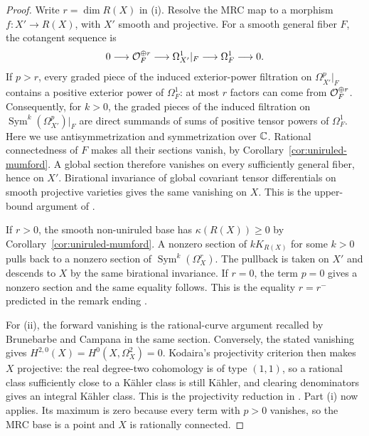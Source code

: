 \begin{proof}
Write \(r=\dim R(X)\) in \textup{(i)}. Resolve the MRC map to a morphism
\(f:X'\to R(X)\), with \(X'\) smooth and projective. For a smooth
general fiber \(F\), the cotangent sequence is
\[
 0\longrightarrow\mathcal{O}_F^{\oplus r}
 \longrightarrow\Omega_{X'}^1|_F
 \longrightarrow\Omega_F^1\longrightarrow0.
\]
If \(p>r\), every graded piece of the induced exterior-power filtration
on \(\Omega_{X'}^p|_F\) contains a positive exterior power of
\(\Omega_F^1\): at most \(r\) factors can come from
\(\mathcal{O}_F^{\oplus r}\). Consequently, for \(k>0\), the graded pieces
of the induced filtration on
\(\operatorname{Sym}^k(\Omega_{X'}^p)|_F\) are direct summands of
sums of positive tensor powers of \(\Omega_F^1\). Here we use
antisymmetrization and symmetrization over \(\mathbb{C}\). Rational
connectedness of \(F\) makes all their sections vanish, by
Corollary~\ref{cor:uniruled-mumford}. A global section therefore
vanishes on every sufficiently general fiber, hence on \(X'\).
Birational invariance of global covariant tensor differentials on smooth
projective varieties gives the same vanishing on \(X\). This is the
upper-bound argument of \cite[Section~3]{BrunebarbeCampana2015}.

If \(r>0\), the smooth non-uniruled base has \(\kappa(R(X))\geq0\) by
Corollary~\ref{cor:uniruled-mumford}. A nonzero section of \(kK_{R(X)}\)
for some \(k>0\) pulls back to a nonzero section of
\(\operatorname{Sym}^k(\Omega_X^r)\). The pullback is taken on \(X'\)
and descends to \(X\) by the same birational invariance. If \(r=0\),
the term \(p=0\) gives a nonzero section and the same equality follows.
This is the equality \(r=r^-\) predicted in the remark ending
\cite[Section~3]{BrunebarbeCampana2015}.

For \textup{(ii)}, the forward vanishing is the rational-curve argument
recalled by Brunebarbe and Campana in the same section. Conversely, the
stated vanishing gives
\(H^{2,0}(X)=H^0(X,\Omega_X^2)=0\). Kodaira's projectivity criterion
then makes \(X\) projective: the real degree-two cohomology is of type
\((1,1)\), so a rational class sufficiently close to a K\"ahler class
is still K\"ahler, and clearing denominators gives an integral K\"ahler
class. This is the projectivity reduction in
\cite[Section~3]{BrunebarbeCampana2015}. Part \textup{(i)} now applies.
Its maximum is zero because every term with \(p>0\) vanishes, so the
MRC base is a point and \(X\) is rationally connected.
\end{proof}

